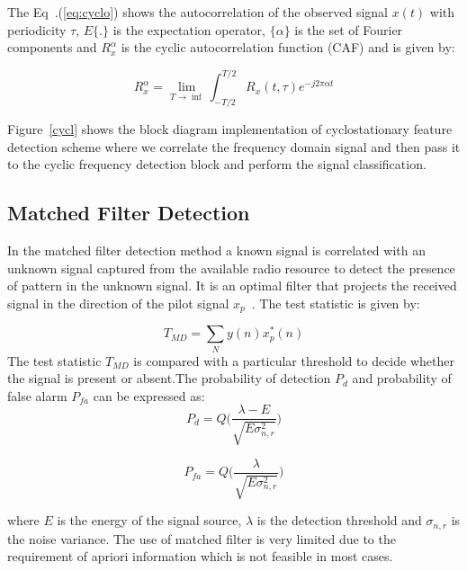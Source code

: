 The Eq~.(\ref{eq:cyclo}) shows the autocorrelation of the observed signal $x(t)$ with periodicity $\tau$, $E\{.\}$ is the expectation operator, $\{\alpha\}$ is the set of Fourier components and $R_x^{\alpha}$ is the cyclic autocorrelation function (CAF) and is given by:

\begin{equation}
R_x^{\alpha} = \lim_{T\rightarrow \inf}\int_{-T/2}^{T/2} R_x(t,\tau)e^{-j2\pi\alpha t}
\end{equation}

Figure~\ref{cycl} shows the block diagram implementation of cyclostationary feature detection scheme where we correlate the frequency domain signal and then pass it to the cyclic frequency detection block and perform the signal classification.

\subsection{Matched Filter Detection}

In the matched filter detection method a known signal is correlated with an unknown signal captured from the available radio resource to detect the presence of pattern in the unknown signal. It is an optimal filter that projects the received signal in the direction of the pilot signal $x_p$~\cite{weidling2005framework}. The test statistic is given by:

\begin{equation}
T_{MD} = \sum_N y(n)x^*_p(n)
\end{equation}
The test statistic $T_{MD}$ is compared with a particular threshold to decide whether the signal is present or absent.The probability of detection $P_d$ and probability of false alarm $P_{fa}$ can be expressed as:
\begin{equation}
P_d = Q\bigg(\dfrac{\lambda-E}{\sqrt{E\sigma_{n,r}^2}}\bigg)
\end{equation}

\begin{equation}
P_{fa} = Q\bigg(\dfrac{\lambda}{\sqrt{E\sigma_{n,r}^2}}\bigg)
\end{equation}

where $E$ is the energy of the signal source, $\lambda$ is the detection threshold and $\sigma_{n,r}$ is the noise variance. The use of matched filter is very limited due to the requirement of apriori information which is not feasible in most cases. 

